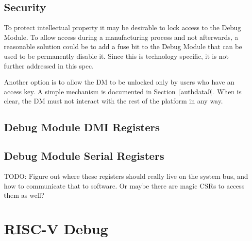\documentclass{article}
\begin{document}
\subsection{Security}

To protect intellectual property it may be desirable to lock access to the
Debug Module.  To allow access during a manufacturing process and not
afterwards, a reasonable solution could be to add a fuse bit to the Debug
Module that can be used to be permanently disable it. Since this is technology
specific, it is not further addressed in this spec.

Another option is to allow the DM to be unlocked only by users who  have an
access key. A simple mechanism is documented in Section~\ref{authdata0}. When
\Fauthenticated is clear, the DM must not interact with the rest of the
platform in any way.

\subsection{Debug Module DMI Registers} \label{dmdebbus}



\subsection{Debug Module Serial Registers} \label{dmsysbus}

TODO: Figure out where these registers should really live on the system bus,
and how to communicate that to software. Or maybe there are magic CSRs to
access them as well?



%
%

\section{RISC-V Debug}
\end{document}
